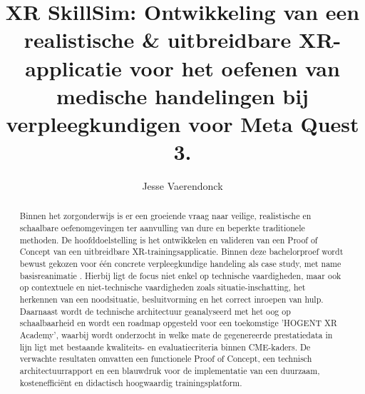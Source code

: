 \documentclass{hogent-article}
\title{XR SkillSim: Ontwikkeling van een realistische \& uitbreidbare XR-applicatie voor het oefenen van medische handelingen bij verpleegkundigen voor Meta Quest 3.}
\author{Jesse Vaerendonck}
\begin{document}
\begin{abstract}
Binnen het zorgonderwijs is er een groeiende vraag naar veilige, realistische en schaalbare oefenomgevingen ter aanvulling van dure en beperkte traditionele methoden. De hoofddoelstelling is het ontwikkelen en valideren van een Proof of Concept van een uitbreidbare XR-trainingsapplicatie. Binnen deze bachelorproef wordt bewust gekozen voor één concrete verpleegkundige handeling als case study, met name basisreanimatie . Hierbij ligt de focus niet enkel op technische vaardigheden, maar ook op contextuele en niet-technische vaardigheden zoals situatie-inschatting, het herkennen van een noodsituatie, besluitvorming en het correct inroepen van hulp. Daarnaast wordt de technische architectuur geanalyseerd met het oog op schaalbaarheid en wordt een roadmap opgesteld voor een toekomstige 'HOGENT XR Academy', waarbij wordt onderzocht in welke mate de gegenereerde prestatiedata in lijn ligt met bestaande kwaliteits- en evaluatiecriteria binnen CME-kaders. De verwachte resultaten omvatten een functionele Proof of Concept, een technisch architectuurrapport en een blauwdruk voor de implementatie van een duurzaam, kostenefficiënt en didactisch hoogwaardig trainingsplatform. 
\end{abstract}

\tableofcontents



\printbibliography[heading=bibintoc]
\end{document}
